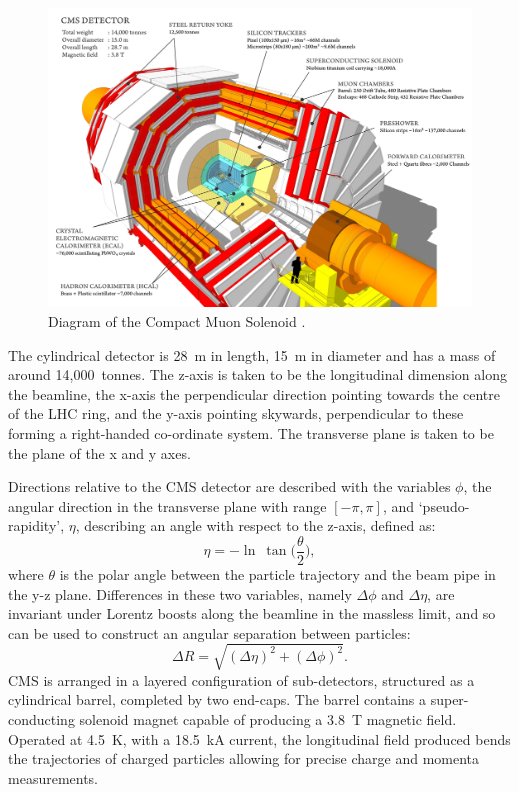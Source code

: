 \begin{figure}
  \centering
  \includegraphics[width=\textwidth]{Figs/machine/cms_120918_02.png}
  \caption{Diagram of the Compact Muon Solenoid
  \cite{Sakuma:2013jqa}.}
  \label{fig:cms_diagram}
\end{figure}

The cylindrical detector is 28~m in length, 15~m in diameter and has a mass of 
around 14,000~tonnes. 
The z-axis is taken to be the longitudinal dimension along the beamline, the
x-axis the perpendicular direction pointing towards the centre of the LHC ring, 
and the y-axis pointing skywards, perpendicular to these forming a right-handed 
co-ordinate system. The transverse plane is taken to be the plane of the x and y
axes.

Directions relative to the CMS detector are described with the variables $\phi$,
the angular direction in the transverse plane with range $[-\pi, \pi]$, and 
`pseudo-rapidity', $\eta$, describing an angle with respect to the z-axis, defined as:
% 
\begin{equation}
\eta = - \ln \ \tan \Bigg( \frac{\theta}{2} \Bigg) ,
\end{equation}
% 
where $\theta$ is the polar angle between the particle trajectory and the beam
pipe in the y-z plane.
Differences in these two variables, namely $\Delta \phi$ and $\Delta 
\eta$, are invariant under Lorentz boosts along the beamline in the massless limit,
and so can be used to construct an angular separation between particles:
% 
\begin{equation}
\Delta R = \sqrt{ (\Delta \eta)^2 + (\Delta \phi)^2}.
\end{equation}
% 
CMS is arranged in a layered configuration of sub-detectors, structured as a 
cylindrical barrel, completed by two end-caps. The barrel contains a
super-conducting solenoid magnet capable of producing a 3.8~T magnetic field. 
Operated at 4.5~K, with a 18.5~kA current, the longitudinal field produced bends
the trajectories of charged particles allowing for precise charge and momenta 
measurements.

